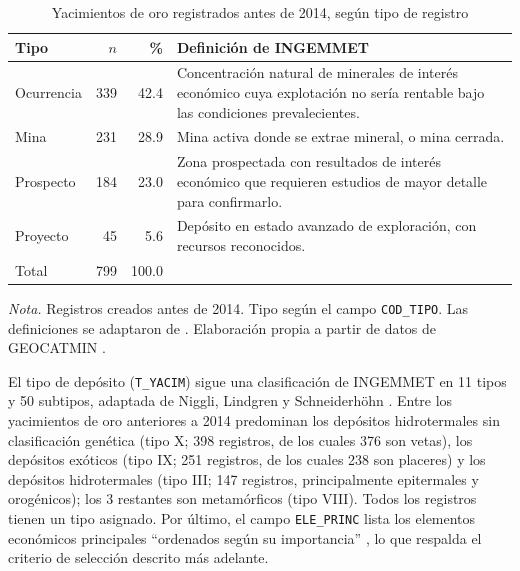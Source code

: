 \documentclass[man,12pt,a4paper,floatsintext,donotrepeattitle]{apa7}
\newcommand{\interlineadosencillo}{\renewcommand{\baselinestretch}{1}\selectfont}
\begin{document}
\begin{table}[htbp]
\caption{Yacimientos de oro registrados antes de 2014, según tipo de registro}
\label{tab:tipos}
\centering
\interlineadosencillo
\begin{threeparttable}
\small
\begin{tabular}{@{}lrrp{8.2cm}@{}}
\toprule
Tipo & $n$ & \% & Definición de INGEMMET \\
\midrule
Ocurrencia & 339 & 42.4 & Concentración natural de minerales de interés
económico cuya explotación no sería rentable bajo las condiciones
prevalecientes. \\
Mina & 231 & 28.9 & Mina activa donde se extrae mineral, o mina cerrada. \\
Prospecto & 184 & 23.0 & Zona prospectada con resultados de interés
económico que requieren estudios de mayor detalle para confirmarlo. \\
Proyecto & 45 & 5.6 & Depósito en estado avanzado de exploración, con
recursos reconocidos. \\
\midrule
Total & 799 & 100.0 & \\
\bottomrule
\end{tabular}
\vspace{6pt}
\begin{tablenotes}[flushleft]
\small
\item \textit{Nota.} Registros creados antes de 2014. Tipo según el campo
\texttt{COD\_TIPO}. Las definiciones
se adaptaron de \textcite{huanacuni2010guia}. Elaboración propia a partir de datos
de GEOCATMIN \parencite{ingemmet2026}.
\end{tablenotes}
\end{threeparttable}
\end{table}

El tipo de depósito (\texttt{T\_YACIM}) sigue una clasificación de INGEMMET en
11 tipos y 50 subtipos, adaptada de Niggli, Lindgren y Schneiderhöhn
\parencite{huanacuni2010guia}. Entre los yacimientos de oro anteriores a 2014 predominan
los depósitos hidrotermales sin clasificación genética (tipo X; 398 registros, de
los cuales 376 son vetas), los depósitos exóticos (tipo IX; 251 registros, de los
cuales 238 son placeres) y los depósitos hidrotermales (tipo III; 147 registros,
principalmente epitermales y orogénicos); los 3 restantes son metamórficos (tipo
VIII). Todos los registros tienen un tipo asignado. Por último, el campo \texttt{ELE\_PRINC} lista
los elementos económicos principales ``ordenados según su importancia''
\parencite{ingemmet2026servicio}, lo que respalda el criterio de selección
descrito más adelante.
\end{document}
